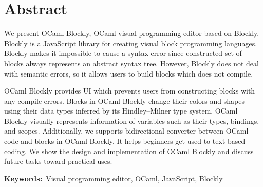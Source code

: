 \chapter*{Abstract}

We present OCaml Blockly, OCaml visual programming editor based on Blockly.
Blockly is a JavaScript library for creating visual block programming languages.
Blockly makes it impossible to cause a syntax error since constructed set of blocks always represents an abstract syntax tree.
However, Blockly does not deal with semantic errors, so it allows users to build blocks which does not compile.

OCaml Blockly provides UI which prevents users from constructing blocks with any compile errors.
Blocks in OCaml Blockly change their colors and shapes using their data types inferred by its Hindley–Milner type system.
OCaml Blockly visually represents information of variables such as their types, bindings, and scopes.
Additionally, we supports bidirectional converter between OCaml code and blocks in OCaml Blockly.
It helps beginners get used to text-based coding.
We show the design and implementation of OCaml Blockly and discuss future tasks toward practical uses.

{\bf Keywords:}\ Visual programming editor, OCaml, JavaScript, Blockly
